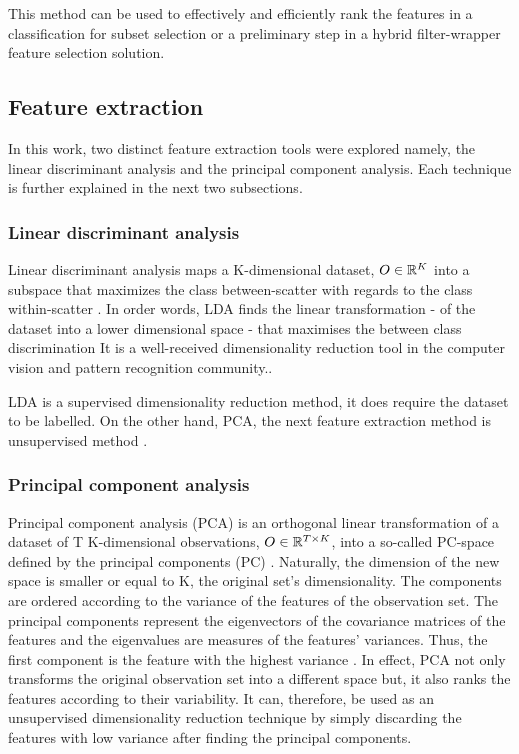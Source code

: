 This method can be used to effectively and efficiently rank the features in a classification for subset selection or a preliminary step in a hybrid filter-wrapper feature selection solution.  

\subsection{Feature extraction}
In this work, two distinct feature extraction tools were explored namely, the linear discriminant analysis and the principal component analysis.
Each technique is further explained in the next two subsections.
 
\subsubsection{Linear discriminant analysis}
Linear discriminant analysis maps a K-dimensional dataset, \(O \in \Bbb R^{K}\) into a subspace that maximizes the class between-scatter with regards to the class within-scatter \cite{prtool}.
In order words, LDA finds the linear transformation - of the dataset into a lower dimensional space - that maximises the between class discrimination \cite{lda2015}
It is a well-received dimensionality reduction tool in the computer vision and pattern recognition community.\cite{lda2015}.

 LDA is a supervised dimensionality reduction method, it does require the dataset to be labelled. On the other hand, PCA, the next feature extraction method is unsupervised method \cite{prtool}.
 
\subsubsection{Principal component analysis}
 Principal component analysis (PCA) is an orthogonal linear transformation of a dataset of T K-dimensional observations, \(O \in \Bbb R^{T\times K}\), into a so-called PC-space defined by the principal components (PC) \cite{dime2017}.
 Naturally, the dimension of the new space is smaller or equal to K, the original set's dimensionality. The components are ordered according to the variance of the features of the observation set. The principal components represent the eigenvectors of the covariance matrices of the features and the eigenvalues are measures of the features' variances. Thus, the first component is the feature with the highest variance \cite{dime2017}.
 In effect, PCA not only transforms the original observation set into a different space but, it also ranks the features according to their variability. It can, therefore, be used as an unsupervised dimensionality reduction technique by simply discarding the features with low variance after finding the principal components.
